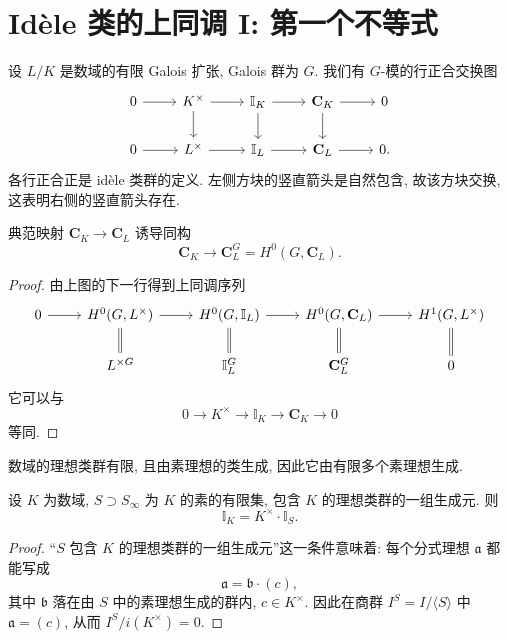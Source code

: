 \section{Idèle 类的上同调 I: 第一个不等式}\label{sec:VII.4}

设 $L/K$ 是数域的有限 Galois 扩张, Galois 群为 $G$. 我们有 $G$-模的行正合交换图
\[
\begin{tikzcd}
0\ar[r] & K^{\times}\ar[r]\ar[d] & \mathbb{I}_{K}\ar[r]\ar[d] & \mathbf{C}_{K}\ar[r]\ar[d] & 0\\
0\ar[r] & L^{\times}\ar[r] & \mathbb{I}_{L}\ar[r] & \mathbf{C}_{L}\ar[r] & 0.
\end{tikzcd}
\]
各行正合正是 idèle 类群的定义. 左侧方块的竖直箭头是自然包含, 故该方块交换, 这表明右侧的竖直箭头存在.

\begin{lemma}\label{lem:vii.4.1}
典范映射 $\mathbf{C}_K\to\mathbf{C}_L$ 诱导同构
\[
\mathbf{C}_{K}\to\mathbf{C}_{L}^{G}=H^{0}(G,\mathbf{C}_{L}).
\]
\end{lemma}

\begin{proof}
由上图的下一行得到上同调序列
\[
\begin{tikzcd}
0\ar[r] & H^{0}(G,L^{\times})\ar[r]\ar[d, equal] & H^{0}(G,\mathbb{I}_{L})\ar[r]\ar[d, equal] & H^{0}(G,\mathbf{C}_{L})\ar[r]\ar[d, equal] & H^{1}(G,L^{\times})\ar[d, equal]\\
 & L^{\times G} & \mathbb{I}_{L}^{G} & \mathbf{C}_{L}^{G} & 0
\end{tikzcd}
\]
它可以与
\[
0\to K^{\times}\to\mathbb{I}_{K}\to\mathbf{C}_{K}\to 0
\]
等同.
\end{proof}

数域的理想类群有限, 且由素理想的类生成, 因此它由有限多个素理想生成.

\begin{lemma}\label{lem:vii.4.2}
设 $K$ 为数域, $S\supset S_{\infty}$ 为 $K$ 的素的有限集, 包含 $K$ 的理想类群的一组生成元. 则
\[
\mathbb{I}_{K}=K^{\times}\cdot\mathbb{I}_{S}.
\]
\end{lemma}

\begin{proof}
``$S$ 包含 $K$ 的理想类群的一组生成元''这一条件意味着: 每个分式理想 $\mathfrak{a}$ 都能写成
\[
\mathfrak{a}=\mathfrak{b}\cdot(c),
\]
其中 $\mathfrak{b}$ 落在由 $S$ 中的素理想生成的群内, $c\in K^{\times}$. 因此在商群 $I^{S}=I/\langle S\rangle$ 中 $\mathfrak{a}=(c)$, 从而 $I^{S}/i(K^{\times})=0$.
\end{proof}


